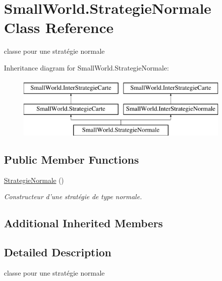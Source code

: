 \hypertarget{class_small_world_1_1_strategie_normale}{\section{Small\-World.\-Strategie\-Normale Class Reference}
\label{class_small_world_1_1_strategie_normale}
}


classe pour une stratégie normale  


Inheritance diagram for Small\-World.\-Strategie\-Normale\-:\begin{figure}[H]
\begin{center}
\leavevmode
\includegraphics[height=3.000000cm]{class_small_world_1_1_strategie_normale}
\end{center}
\end{figure}
\subsection*{Public Member Functions}
\begin{DoxyCompactItemize}
\item 
\hyperlink{class_small_world_1_1_strategie_normale_af41c3c9eb19a068ab004e950b6e47a37}{Strategie\-Normale} ()
\begin{DoxyCompactList}\small\item\em Constructeur d'une stratégie de type normale. \end{DoxyCompactList}\end{DoxyCompactItemize}
\subsection*{Additional Inherited Members}


\subsection{Detailed Description}
classe pour une stratégie normale 

